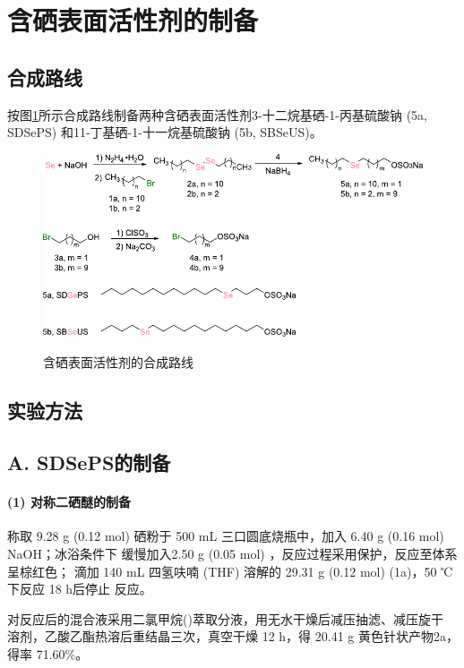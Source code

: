 \documentclass[bachelor,winfonts,replaceperiod]{jnuthesis}
\begin{document}
    \section{含硒表面活性剂的制备}
    \subsection{合成路线}
    按图\ref{fig:scheme-synthesis}所示合成路线制备两种含硒表面活性剂3-十二烷基硒-1-丙基硫酸钠 
    (5a, SDSePS) 和11-丁基硒-1-十一烷基硫酸钠 (5b, SBSeUS)。
    \begin{figure}[htbp]
        \centering
        \includegraphics[scale=1]{figure/scheme-synthesis.pdf}\\
        \caption{含硒表面活性剂的合成路线}\label{fig:scheme-synthesis}
    \end{figure}

    \subsection{实验方法}
    \subsection*{A. SDSePS的制备}
    \paragraph*{(1) 对称二硒醚的制备}
    称取 9.28 g (0.12 mol) 硒粉于 500 mL 三口圆底烧瓶中，加入 6.40 g (0.16 mol) NaOH；冰浴条件下
    缓慢加入2.50 g (0.05 mol) ，反应过程采用保护，反应至体系呈棕红色； 
    滴加 140 mL 四氢呋喃 (THF) 溶解的 29.31 g (0.12 mol)  (1a)，50 ℃下反应 18 h后停止
    反应。
    
    对反应后的混合液采用二氯甲烷()萃取分液，用无水干燥后减压抽滤、减压旋干
    溶剂，乙酸乙酯热溶后重结晶三次，真空干燥 12 h，得 20.41 g 黄色针状产物2a，得率 71.60\%。
    
\end{document}
